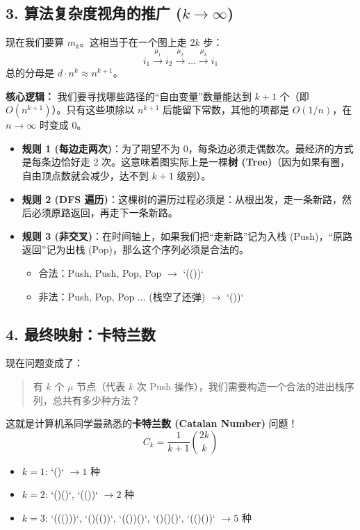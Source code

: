 \documentclass[11pt,a4paper]{ctexart}
\theoremstyle{definition}
\theoremstyle{remark}
\begin{document}
\subsection{3. 算法复杂度视角的推广 ($k \to \infty$)}

现在我们要算 $m_k$。这相当于在一个图上走 $2k$ 步：
\[
i_1 \xrightarrow{\mu_1} i_2 \xrightarrow{\mu_2} \dots \xrightarrow{\mu_k} i_1
\]
总的分母是 $d \cdot n^k \approx n^{k+1}$。

\textbf{核心逻辑：}
我们要寻找哪些路径的“自由变量”数量能达到 $k+1$ 个（即 $O(n^{k+1})$）。只有这些项除以 $n^{k+1}$ 后能留下常数，其他的项都是 $O(1/n)$，在 $n \to \infty$ 时变成 0。

\begin{itemize}
    \item \textbf{规则 1 (每边走两次)}：为了期望不为 0，每条边必须走偶数次。最经济的方式是每条边恰好走 2 次。这意味着图实际上是一棵\textbf{树 (Tree)}（因为如果有圈，自由顶点数就会减少，达不到 $k+1$ 级别）。
    
    \item \textbf{规则 2 (DFS 遍历)}：这棵树的遍历过程必须是：从根出发，走一条新路，然后必须原路返回，再走下一条新路。
    
    \item \textbf{规则 3 (非交叉)}：在时间轴上，如果我们把“走新路”记为入栈 (Push)，“原路返回”记为出栈 (Pop)，那么这个序列必须是合法的。
    \begin{itemize}
        \item 合法：Push, Push, Pop, Pop $\to$ `(())`
        \item 非法：Push, Pop, Pop $\dots$ (栈空了还弹) $\to$ `())`
    \end{itemize}
\end{itemize}

\subsection{4. 最终映射：卡特兰数}

现在问题变成了：
\begin{quote}
    有 $k$ 个 $\mu$ 节点（代表 $k$ 次 Push 操作），我们需要构造一个合法的进出栈序列，总共有多少种方法？
\end{quote}

这就是计算机系同学最熟悉的\textbf{卡特兰数 (Catalan Number)} 问题！
\[
C_k = \frac{1}{k+1} \binom{2k}{k}
\]

\begin{itemize}
    \item $k=1$: `()` $\to 1$ 种
    \item $k=2$: `()()`, `(())` $\to 2$ 种
    \item $k=3$: `((()))`, `()(())`, `(())()`, `()()()`, `(()())` $\to 5$ 种
\end{itemize}
\end{document}
